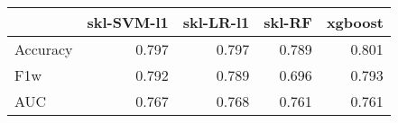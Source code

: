 \begin{tabular}{lrrrr}
\toprule
{} &  skl-SVM-l1 &  skl-LR-l1 &  skl-RF &  xgboost \\
\midrule
Accuracy &       0.797 &      0.797 &   0.789 &    0.801 \\
F1w      &       0.792 &      0.789 &   0.696 &    0.793 \\
AUC      &       0.767 &      0.768 &   0.761 &    0.761 \\
\bottomrule
\end{tabular}
